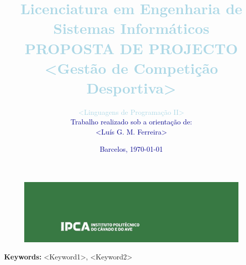 \documentclass[10pt,a4paper,twoside,openright]{report}
\begin{document}

%
%

%
%
\makeatletter
\setlength{\@fptop}{0pt}
\makeatother

\begin{figure}[t!]
	\centering
	\includegraphics[keepaspectratio, width=\textwidth]{./Figures/ipca.jpg}
	\label{fig:ipca}
  \end{figure}

\title{
	\textbf{\Large{\textcolor{lightBlue}{Licenciatura em Engenharia de Sistemas Informáticos}}}\\
	\bigskip
	\Large{\textcolor{lightBlue}{PROPOSTA DE PROJECTO}}\\
	\bigskip
	\textbf{\Huge{\textcolor{lightBlue}{<Gestão de Competição Desportiva>}}}
}


\author{
	\bigskip
	\huge{\textcolor{lightBlue}{<Linguagens de Programação II>}}\\
	\textcolor{darkBlue}{Trabalho realizado sob a orientação de:}\\
	\textcolor{darkBlue}{<Luís G. M. Ferreira>}\\
}
\date{\textcolor{darkBlue}{Barcelos, \today}}

\maketitle

%
%
\bigskip
\textbf{\Large Keywords:} <Keyword1>, <Keyword2>
\bigskip

\tableofcontents

%
%














%
%


\end{document}
